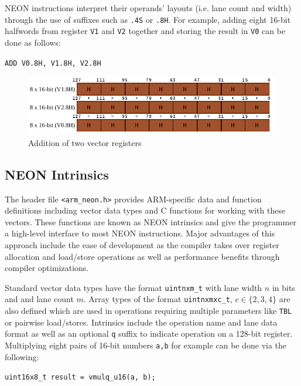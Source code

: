 NEON instructions interpret their operands' layouts (i.e. lane count and width)
through the use of suffixes such as \texttt{.4S} or \texttt{.8H}. For example,
adding eight 16-bit halfwords from register \texttt{V1} and \texttt{V2}
together and storing the result in \texttt{V0} can be done as follows:

\begin{center}
    \texttt{ADD V0.8H, V1.8H, V2.8H}
\end{center}

\begin{figure}[h!]
    \centering
    \includegraphics[width=\textwidth]{Figures/vector_add.pdf}
    \caption{Addition of two vector registers}
\end{figure}

\subsection{NEON Intrinsics}

The header file \texttt{<arm\_neon.h>} provides ARM-specific data and function
definitions including vector data types and C functions for working with these
vectors. These functions are known as NEON intrinsics \cite{neonintr:2022} and
give the programmer a high-level interface to most NEON instructions. Major
advantages of this approach include the ease of development as the compiler
takes over register allocation and load/store operations as well as performance
benefits through compiler optimizations.

Standard vector data types have the format \texttt{uintnxm\_t} with lane width
$n$ in bits and and lane count $m$. Array types of the format
\texttt{uintnxmxc\_t}, $c\in\{2,3,4\}$ are also defined which are used in
operations requiring multiple parameters like \texttt{TBL} or pairwise
load/stores. Intrinsics include the operation name and lane data format as well
as an optional \texttt{q} suffix to indicate operation on a 128-bit register.
Multiplying eight pairs of 16-bit numbers \texttt{a,b} for example can be done
via the following:

\begin{center}
    \texttt{uint16x8\_t result = vmulq\_u16(a, b);}
\end{center}

